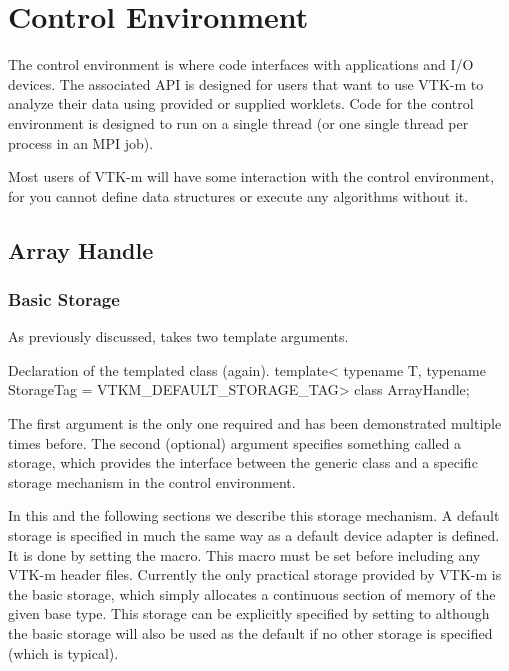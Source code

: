 
\chapter{Control Environment}
\label{chap:ControlEnvironment}


The control environment is where code interfaces with applications and I/O
devices. The associated API is designed for users that want to use VTK-m to
analyze their data using provided or supplied worklets. Code for the
control environment is designed to run on a single thread (or one single
thread per process in an MPI job).

Most users of VTK-m will have some interaction with the control
environment, for you cannot define data structures or execute any
algorithms without it.

\section{Array Handle}
\label{sec:ArrayHandle}


\subsection{Basic Storage}


As previously discussed,  takes two template arguments.
\begin{vtkmexample}{Declaration of the \protect{} templated class (again).}
template<
    typename T,
    typename StorageTag = VTKM_DEFAULT_STORAGE_TAG>
class ArrayHandle;
\end{vtkmexample}
The first argument is the only one required and has been demonstrated
multiple times before. The second (optional) argument specifies something
called a storage, which provides the interface between the generic
 class and a specific storage mechanism in the
control environment.

In this and the following sections we describe this storage mechanism.  A
default storage is specified in much the same way as a default device
adapter is defined. It is done by setting the 
macro. This macro must be set before including any VTK-m header
files. Currently the only practical storage provided by VTK-m is the basic
storage, which simply allocates a continuous section of memory of the given
base type. This storage can be explicitly specified by setting
 to  although the
basic storage will also be used as the default if no other storage is
specified (which is typical).

